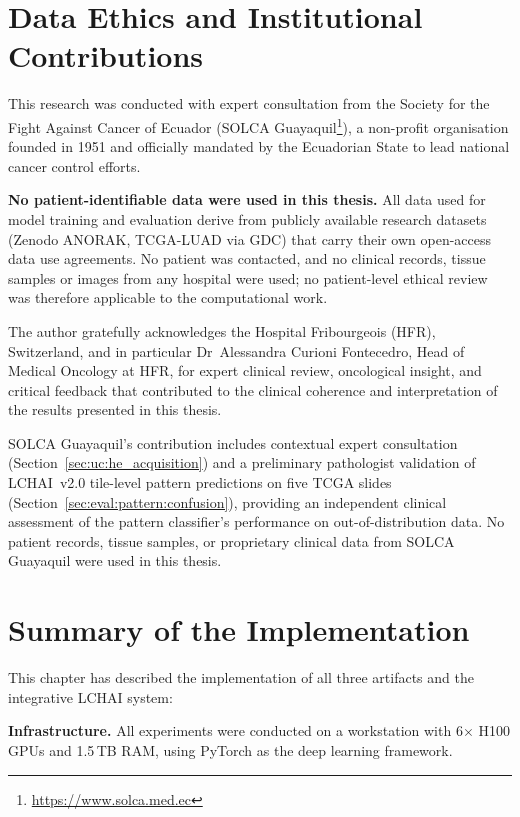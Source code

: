 \section{Data Ethics and Institutional Contributions}
\label{sec:impl:ethical}
 
This research was conducted with expert consultation from the Society for
the Fight Against Cancer of Ecuador
(SOLCA Guayaquil\footnote{\url{https://www.solca.med.ec}}), a non-profit
organisation founded in 1951 and officially mandated by the Ecuadorian
State to lead national cancer control efforts.
 
\textbf{No patient-identifiable data were used in this thesis.}
All data used for model training and evaluation derive from publicly
available research datasets (Zenodo ANORAK, TCGA-LUAD via GDC) that
carry their own open-access data use agreements.
No patient was contacted, and no clinical records, tissue samples or
images from any hospital were used; no patient-level ethical review was
therefore applicable to the computational work.
 
The author gratefully acknowledges the Hospital Fribourgeois (HFR),
Switzerland, and in particular Dr~Alessandra Curioni Fontecedro, Head
of Medical Oncology at HFR, for expert clinical review, oncological
insight, and critical feedback that contributed to the clinical
coherence and interpretation of the results presented in this thesis.
 
SOLCA Guayaquil's contribution includes contextual expert consultation
(Section~\ref{sec:uc:he_acquisition}) and a preliminary pathologist
validation of LCHAI~v2.0 tile-level pattern predictions on five TCGA
slides (Section~\ref{sec:eval:pattern:confusion}), providing an
independent clinical assessment of the pattern classifier's
performance on out-of-distribution data.
No patient records, tissue samples, or proprietary clinical data from
SOLCA Guayaquil were used in this thesis.

\section{Summary of the Implementation}
\label{sec:impl:summary}

This chapter has described the implementation of all three artifacts and
the integrative LCHAI system:

\textbf{Infrastructure.}
All experiments were conducted on a workstation with 6$\times$ H100 GPUs
and 1.5\,TB RAM, using PyTorch as the deep learning framework.

